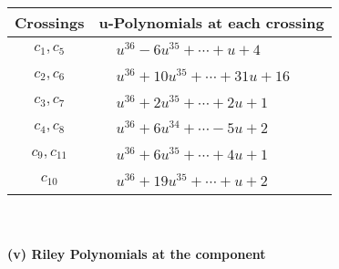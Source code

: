 \documentclass[1p]{elsarticle_modified}
\theoremstyle{definition}
\begin{document}
\begin{tabular}{m{50pt}|m{274pt}}
Crossings & \hspace{64pt}u-Polynomials at each crossing \\
\hline $$\begin{aligned}c_{1},c_{5}\end{aligned}$$&$\begin{aligned}
&u^{36}-6 u^{35}+\cdots+u+4
\end{aligned}$\\
\hline $$\begin{aligned}c_{2},c_{6}\end{aligned}$$&$\begin{aligned}
&u^{36}+10 u^{35}+\cdots+31 u+16
\end{aligned}$\\
\hline $$\begin{aligned}c_{3},c_{7}\end{aligned}$$&$\begin{aligned}
&u^{36}+2 u^{35}+\cdots+2 u+1
\end{aligned}$\\
\hline $$\begin{aligned}c_{4},c_{8}\end{aligned}$$&$\begin{aligned}
&u^{36}+6 u^{34}+\cdots-5 u+2
\end{aligned}$\\
\hline $$\begin{aligned}c_{9},c_{11}\end{aligned}$$&$\begin{aligned}
&u^{36}+6 u^{35}+\cdots+4 u+1
\end{aligned}$\\
\hline $$\begin{aligned}c_{10}\end{aligned}$$&$\begin{aligned}
&u^{36}+19 u^{35}+\cdots+u+2
\end{aligned}$\\
\hline
\end{tabular}\\~\\
\newpage\renewcommand{\arraystretch}{1}
\flushleft \textbf{(v) Riley Polynomials at the component}\newline \\
\end{document}
